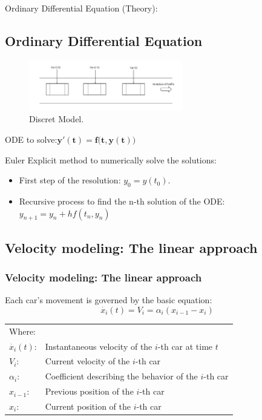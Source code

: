 \documentclass{beamer}
\begin{document}
\begin{frame}{Ordinary Differential Equation (Theory):}
\subsection{Ordinary Differential Equation}
\begin{figure}
    \centering
    \includegraphics[width=0.6\textwidth]{discret.png} 
    \caption{ Discret Model.}
\end{figure}
\begin{center}
   ODE to solve:$\boxed{\mathbf{y'(t) = f{\bigl (}t, y(t){\bigr )}}}$
\end{center}
Euler Explicit method to numerically solve the solutions:
    \begin{itemize}

			\item First step of the resolution: $\boxed{y_0 = y(t_0)}$.
			\item Recursive process to find the n-th solution of the ODE: $\boxed{y_{n+1} = y_{n} + hf(t_{n}, y_{n})}$
		\end{itemize}
\end{frame}
\begin{frame}
\subsection{Velocity modeling: The linear approach}
\frametitle{Velocity modeling: The linear approach}
\begin{center}
    Each car's movement is governed by the basic equation:
    \[
\boxed{\dot{x_i}(t) = V_i = \alpha_i(x_{i-1} - x_i)}
\]
\end{center}

\vspace{5mm}

\begin{center}
    \begin{tabular}{l l}
    Where:\\
        \(\dot{x_i}(t)\): & Instantaneous velocity of the \(i\)-th car at time \(t\) \\
        \(V_i\): & Current velocity of the \(i\)-th car \\
        \(\alpha_i\): & Coefficient describing the behavior of the \(i\)-th car \\
        \(x_{i-1}\): & Previous position of the \(i\)-th car \\
        \(x_i\): & Current position of the \(i\)-th car
    \end{tabular}
\end{center}
\end{frame}
\end{document}
